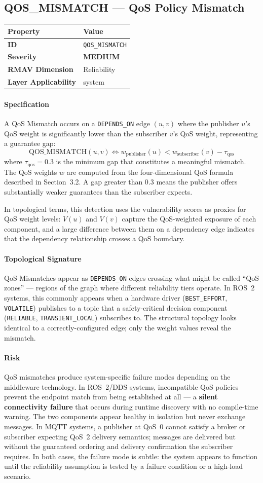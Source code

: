 \documentclass[11pt]{article}
\makeatletter
\newcommand{\MEDIUM}{\textcolor{yellow!50!black}{\textbf{MEDIUM}}}
\newcommand{\patternprop}[4]{%
  \begin{center}
  \begin{tabular}{@{}ll@{}}
  \toprule
  \textbf{Property} & \textbf{Value} \\
  \midrule
  \textbf{ID} & \texttt{#1} \\
  \textbf{Severity} & #2 \\
  \textbf{RMAV Dimension} & #3 \\
  \textbf{Layer Applicability} & #4 \\
  \bottomrule
  \end{tabular}
  \end{center}
}
\makeatother
\begin{document}
\subsection{QOS\_MISMATCH --- QoS Policy Mismatch}
\patternprop{QOS\_MISMATCH}{\MEDIUM}{Reliability}{system}

\paragraph{Specification}
A QoS Mismatch occurs on a \texttt{DEPENDS\_ON} edge $(u,v)$ where the publisher $u$'s QoS weight is significantly lower than the subscriber $v$'s QoS weight, representing a guarantee gap:
\[
\mathrm{QOS\_MISMATCH}(u,v) \Leftrightarrow w_{\text{publisher}}(u) < w_{\text{subscriber}}(v) - \tau_{\text{qos}}
\]
where $\tau_{\text{qos}} = 0.3$ is the minimum gap that constitutes a meaningful mismatch. The QoS weights $w$ are computed from the four-dimensional QoS formula described in Section~3.2. A gap greater than 0.3 means the publisher offers substantially weaker guarantees than the subscriber expects.

In topological terms, this detection uses the vulnerability scores as proxies for QoS weight levels: $V(u)$ and $V(v)$ capture the QoS-weighted exposure of each component, and a large difference between them on a dependency edge indicates that the dependency relationship crosses a QoS boundary.

\paragraph{Topological Signature}
QoS Mismatches appear as \texttt{DEPENDS\_ON} edges crossing what might be called ``QoS zones'' --- regions of the graph where different reliability tiers operate. In ROS~2 systems, this commonly appears when a hardware driver (\texttt{BEST\_EFFORT}, \texttt{VOLATILE}) publishes to a topic that a safety-critical decision component (\texttt{RELIABLE}, \texttt{TRANSIENT\_LOCAL}) subscribes to. The structural topology looks identical to a correctly-configured edge; only the weight values reveal the mismatch.

\paragraph{Risk}
QoS mismatches produce system-specific failure modes depending on the middleware technology. In ROS~2/DDS systems, incompatible QoS policies prevent the endpoint match from being established at all --- a \textbf{silent connectivity failure} that occurs during runtime discovery with no compile-time warning. The two components appear healthy in isolation but never exchange messages. In MQTT systems, a publisher at QoS~0 cannot satisfy a broker or subscriber expecting QoS~2 delivery semantics; messages are delivered but without the guaranteed ordering and delivery confirmation the subscriber requires. In both cases, the failure mode is subtle: the system appears to function until the reliability assumption is tested by a failure condition or a high-load scenario.
\end{document}
